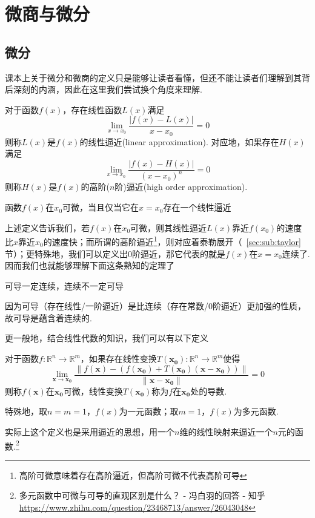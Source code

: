 
\section{微商与微分}
\subsection{微分}
课本上关于微分和微商的定义只是能够让读者看懂，但还不能让读者们理解到其背后深刻的内涵，因此在这里我们尝试换个角度来理解.
\begin{definition}
对于函数$f(x)$，存在线性函数$L(x)$满足
\[\lim_{x\to x_0}\frac{|f(x)-L(x)|}{x-x_0}=0\]
则称$L(x)$是$f(x)$的线性逼近(linear approximation).
对应地，如果存在$H(x)$满足
\[\lim_{x\to x_0}\frac{|f(x)-H(x)|}{(x-x_0)^n}=0\]
则称$H(x)$是$f(x)$的高阶($n$阶)逼近(high order approximation).
\end{definition}
\begin{definition}[可微性]
\label{differentiability}
函数$f(x)$在$x_0$可微，当且仅当它在$x=x_0$存在一个线性逼近
\end{definition}
上述定义告诉我们，若$f(x)$在$x_0$可微，则其线性逼近$L(x)$靠近$f(x_0)$的速度比$x$靠近$x_0$的速度快；而所谓的高阶逼近\footnote{高阶可微意味着存在高阶逼近，但高阶可微不代表高阶可导}，则对应着泰勒展开（~\ref{sec:sub:taylor}节）；更特殊地，我们可以定义出$0$阶逼近，那它代表的就是$f(x)$在$x=x_0$连续了. 因而我们也就能够理解下面这条熟知的定理了
\begin{theorem}
可导一定连续，连续不一定可导
\end{theorem}
因为可导（存在线性/一阶逼近）是比连续（存在常数/$0$阶逼近）更加强的性质，故可导是蕴含着连续的.
\par 更一般地，结合线性代数的知识，我们可以有以下定义
\begin{definition}
对于函数$f:\mathbb{R}^n\to\mathbb{R}^m$，如果存在线性变换$T(\mathbf{x_0}):\mathbb{R}^n\to\mathbb{R}^m$使得
\[\lim_{\mathbf{x}\to \mathbf{x_0}}\frac{\|f(\mathbf{x})-(f(\mathbf{x_0})+T(\mathbf{x_0})(\mathbf{x}-\mathbf{x_0}))\|}{\|\mathbf{x}-\mathbf{x_0}\|}=0\]
则称$f(\mathbf{x})$在$\mathbf{x_0}$可微，线性变换$T(\mathbf{x_0})$称为$f$在$\mathbf{x_0}$处的导数.
\par 特殊地，取$n=m=1$，$f(x)$为一元函数；取$m=1$，$f(x)$为多元函数.
\end{definition}
实际上这个定义也是采用逼近的思想，用一个$n$维的线性映射来逼近一个$n$元的函数.\footnote{多元函数中可微与可导的直观区别是什么？ - 冯白羽的回答 - 知乎 \url{https://www.zhihu.com/question/23468713/answer/26043048}}
